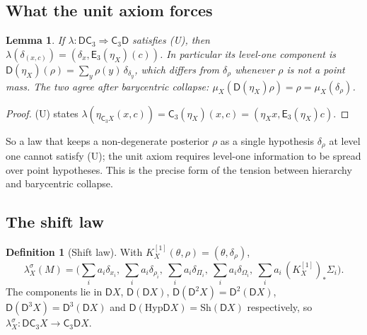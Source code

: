 \documentclass[11pt]{article}
\newtheorem{lemma}[theorem]{Lemma}
\theoremstyle{definition}
\newtheorem{definition}[theorem]{Definition}
\theoremstyle{remark}
\newcommand{\D}{\mathsf{D}}
\newcommand{\Hyp}{\mathrm{Hyp}}
\newcommand{\Sh}{\mathrm{Sh}}
\newcommand{\C}{\mathsf{C}}
\newcommand{\E}{\mathsf{E}}
\newcommand{\ls}{\lambda^{\sigma}}
\begin{document}
\subsection{What the unit axiom forces}

\begin{lemma}\label{lem:unit-forces}
If $\lambda\colon\D\C_3\Rightarrow\C_3\D$ satisfies (U), then
$\lambda(\delta_{(x,c)})=(\delta_x,\E_3(\eta_X)(c))$. In particular its level-one component is
$\D(\eta_X)(\rho)=\sum_y\rho(y)\,\delta_{\delta_y}$, which differs from $\delta_\rho$ whenever $\rho$ is
not a point mass. The two agree after barycentric collapse: $\mu_X(\D(\eta_X)\rho)=\rho=\mu_X(\delta_\rho)$.
\end{lemma}
\begin{proof}
(U) states $\lambda(\eta_{\C_3X}(x,c))=\C_3(\eta_X)(x,c)=(\eta_Xx,\E_3(\eta_X)c)$.
\end{proof}

So a law that keeps a non-degenerate posterior $\rho$ as a single hypothesis $\delta_\rho$ at level one
cannot satisfy (U); the unit axiom requires level-one information to be spread over point
hypotheses. This is the precise form of the tension between hierarchy and barycentric collapse.

\subsection{The shift law}

\begin{definition}[Shift law]
With $K^{[1]}_X(\theta,\rho)=(\theta,\delta_\rho)$,
\[
\ls_X(M)=\Big(\sum_ia_i\delta_{x_i},\ \sum_ia_i\delta_{\rho_i},\ \sum_ia_i\delta_{\Pi_i},\
\sum_ia_i\delta_{\Omega_i},\ \sum_ia_i\,(K^{[1]}_X)_*\Sigma_i\Big).
\]
The components lie in $\D X$, $\D(\D X)$, $\D(\D^2X)=\D^2(\D X)$, $\D(\D^3X)=\D^3(\D X)$ and
$\D(\Hyp\D X)=\Sh(\D X)$ respectively, so $\ls_X\colon\D\C_3X\to\C_3\D X$.
\end{definition}
\end{document}

